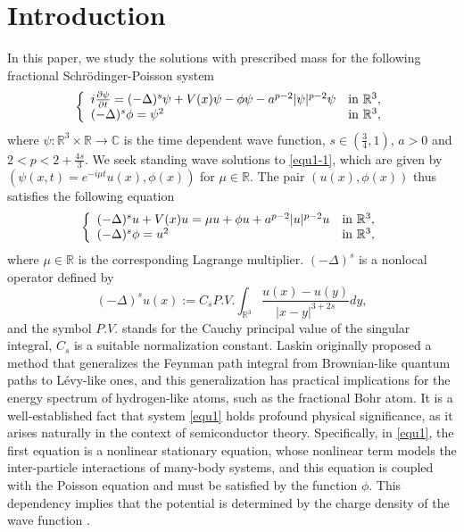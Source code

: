 \documentclass[reqno, 11pt]{amsart} %
\numberwithin{equation}{section}
\begin{document}
	\section{Introduction}
	In this paper, we study the solutions with prescribed mass for the following fractional Schr\"{o}dinger-Poisson system
	\begin{equation}\label{equ1-1}
		\left\{
		\begin{array}{ll}
			i\frac{\partial\psi }{\partial t}=(-\Delta)^{s}\psi+V(x)\psi-\phi \psi-a^{p-2}|\psi|^{p-2}\psi & \hbox{in $\mathbb{R}^{3}$},\\
			(-\Delta)^{s}\phi=\psi ^{2}& \hbox{in $\mathbb{R}^{3}$},
		\end{array}
		\right.
	\end{equation}
	where $\psi: \mathbb{R}^{3}\times\mathbb{R}\rightarrow\mathbb{C}$  is the time dependent wave function, $s\in (\frac{3}{4}, 1)$, $a>0$ and $2<p<2+\frac{4s}{3}$. We seek standing wave solutions to \eqref{equ1-1}, which are given by $\left(\psi(x, t)=e^{-i\mu t}u(x),  \phi(x)\right) $ for $\mu\in \mathbb{R}$. The pair $(u(x), \phi (x))$ thus satisfies the following equation
	\begin{equation}\label{equ1}
		\left\{
		\begin{array}{ll}
			(-\Delta)^{s}u+V(x)u=\mu u+\phi u+a^{p-2}|u|^{p-2}u& \hbox{in $\mathbb{R}^{3}$},\\
			(-\Delta)^{s}\phi=u^{2}& \hbox{in $\mathbb{R}^{3}$},
		\end{array}
		\right.
	\end{equation}
	where $\mu\in \mathbb{R}$ is the corresponding Lagrange multiplier. $(-\Delta)^{s}$ is a nonlocal operator defined by
	\begin{equation*}
		(-\Delta)^{s}u(x):=C_{s}P.V.\int_{\mathbb{R}^{3}}\frac{u(x)-u(y)}{|x-y|^{3+2s}}dy,
	\end{equation*}
	and the symbol $P.V.$ stands for the Cauchy principal value of the singular integral, $C_{s}$ is a suitable normalization constant. Laskin \cite{LP,LPR} originally proposed a method that generalizes the Feynman path integral from Brownian-like quantum paths to L\'{e}vy-like ones, and this generalization has practical implications for the energy spectrum of hydrogen-like atoms, such as the fractional Bohr atom. It is a well-established fact that system \eqref{equ1} holds profound physical significance, as it arises naturally in the context of semiconductor theory. Specifically, in \eqref{equ1}, the first equation is a nonlinear stationary equation, whose nonlinear term models the inter-particle interactions of many-body systems, and this equation is coupled with the Poisson equation and must be satisfied by the function $\phi$. This dependency implies that the potential is determined by the charge density of the wave function \cite{M}.
	
\end{document}
